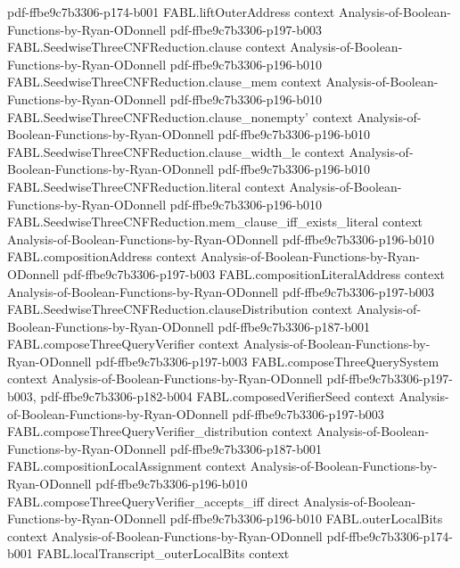 \begin{theorem}
  {pdf-ffbe9c7b3306-p174-b001}
\proofstep
  {FABL.liftOuterAddress}
  {context}
  {Analysis-of-Boolean-Functions-by-Ryan-ODonnell}
  {pdf-ffbe9c7b3306-p197-b003}
\proofstep
  {FABL.SeedwiseThreeCNFReduction.clause}
  {context}
  {Analysis-of-Boolean-Functions-by-Ryan-ODonnell}
  {pdf-ffbe9c7b3306-p196-b010}
\proofstep
  {FABL.SeedwiseThreeCNFReduction.clause_mem}
  {context}
  {Analysis-of-Boolean-Functions-by-Ryan-ODonnell}
  {pdf-ffbe9c7b3306-p196-b010}
\proofstep
  {FABL.SeedwiseThreeCNFReduction.clause_nonempty'}
  {context}
  {Analysis-of-Boolean-Functions-by-Ryan-ODonnell}
  {pdf-ffbe9c7b3306-p196-b010}
\proofstep
  {FABL.SeedwiseThreeCNFReduction.clause_width_le}
  {context}
  {Analysis-of-Boolean-Functions-by-Ryan-ODonnell}
  {pdf-ffbe9c7b3306-p196-b010}
\proofstep
  {FABL.SeedwiseThreeCNFReduction.literal}
  {context}
  {Analysis-of-Boolean-Functions-by-Ryan-ODonnell}
  {pdf-ffbe9c7b3306-p196-b010}
\proofstep
  {FABL.SeedwiseThreeCNFReduction.mem_clause_iff_exists_literal}
  {context}
  {Analysis-of-Boolean-Functions-by-Ryan-ODonnell}
  {pdf-ffbe9c7b3306-p196-b010}
\proofstep
  {FABL.compositionAddress}
  {context}
  {Analysis-of-Boolean-Functions-by-Ryan-ODonnell}
  {pdf-ffbe9c7b3306-p197-b003}
\proofstep
  {FABL.compositionLiteralAddress}
  {context}
  {Analysis-of-Boolean-Functions-by-Ryan-ODonnell}
  {pdf-ffbe9c7b3306-p197-b003}
\proofstep
  {FABL.SeedwiseThreeCNFReduction.clauseDistribution}
  {context}
  {Analysis-of-Boolean-Functions-by-Ryan-ODonnell}
  {pdf-ffbe9c7b3306-p187-b001}
\proofstep
  {FABL.composeThreeQueryVerifier}
  {context}
  {Analysis-of-Boolean-Functions-by-Ryan-ODonnell}
  {pdf-ffbe9c7b3306-p197-b003}
\proofstep
  {FABL.composeThreeQuerySystem}
  {context}
  {Analysis-of-Boolean-Functions-by-Ryan-ODonnell}
  {pdf-ffbe9c7b3306-p197-b003,
    pdf-ffbe9c7b3306-p182-b004}
\proofstep
  {FABL.composedVerifierSeed}
  {context}
  {Analysis-of-Boolean-Functions-by-Ryan-ODonnell}
  {pdf-ffbe9c7b3306-p197-b003}
\proofstep
  {FABL.composeThreeQueryVerifier_distribution}
  {context}
  {Analysis-of-Boolean-Functions-by-Ryan-ODonnell}
  {pdf-ffbe9c7b3306-p187-b001}
\proofstep
  {FABL.compositionLocalAssignment}
  {context}
  {Analysis-of-Boolean-Functions-by-Ryan-ODonnell}
  {pdf-ffbe9c7b3306-p196-b010}
\proofstep
  {FABL.composeThreeQueryVerifier_accepts_iff}
  {direct}
  {Analysis-of-Boolean-Functions-by-Ryan-ODonnell}
  {pdf-ffbe9c7b3306-p196-b010}
\proofstep
  {FABL.outerLocalBits}
  {context}
  {Analysis-of-Boolean-Functions-by-Ryan-ODonnell}
  {pdf-ffbe9c7b3306-p174-b001}
\proofstep
  {FABL.localTranscript_outerLocalBits}
  {context}

\end{theorem}
